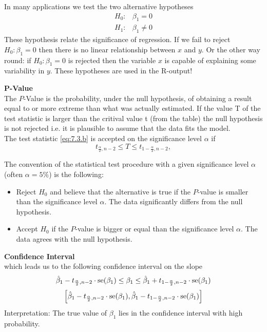 In many applications we test the two alternative hypotheses
\begin{equation}
  \begin{split}
    H_0:& \beta_1 = 0\\
    H_1:& \beta_1 \neq0
  \end{split}
\end{equation}
These hypothesis relate the significance of regression. If we fail to reject $H_0 : \beta_1 = 0$ then there is no linear relationship between $x$ and $y$.
Or the other way round: if $H_0 : \beta_1 = 0$ is rejected then the variable $x$ is capable of explaining some variability in $y$.
These hypotheses are used in the R-output!

\textbf{P-Value}\\
The $P$-Value is the probability, under the null hypothesis, of obtaining a result equal to or more extreme than what was actually estimated. If the value T of the test statistic is larger than the critival value t (from the table) the null hypothesis is not rejected i.e. it is plausible to assume that the data fits the model.\\

The test statistic \ref{eq:7.3.b} is accepted on the significance level $\alpha$ if
\begin{equation}
  t_{\frac{\alpha}{2}, n-2} \leq T \leq t_{1-\frac{\alpha}{2}, n-2},
\end{equation}

The convention of the statistical test procedure with a given significance level $\alpha$ (often $\alpha = 5\%$) is the following:
\begin{itemize}
  \item Reject $H_0$ and believe that the alternative is true if the $P$-value is smaller than the significance level $\alpha$. The data significantly differs from the null hypothesis.
  \item Accept $H_0$ if the $P$-value is bigger or equal than the significance level $\alpha$. The data agrees with the null hypothesis.
\end{itemize}

\textbf{Confidence Interval}\\
which leads us to the following confidence interval on the slope
\begin{equation}
  \hat{\beta}_1 - t_{\frac{\alpha}{2}, n-2} \cdot \textup{se}(\beta_1)
  \leq \beta_1 \leq
  \hat{\beta}_1 + t_{1-\frac{\alpha}{2}, n-2} \cdot \textup{se}(\beta_1)
\end{equation}
\begin{equation}
  \left[
  \hat{\beta}_1 - t_{\frac{\alpha}{2}, n-2} \cdot \textup{se}(\beta_1),
  \hat{\beta}_1 - t_{1-\frac{\alpha}{2}, n-2} \cdot \textup{se}(\beta_1)\right]
\end{equation}
Interpretation: The true value of $\beta_1$ lies in the confidence interval with high probability.

